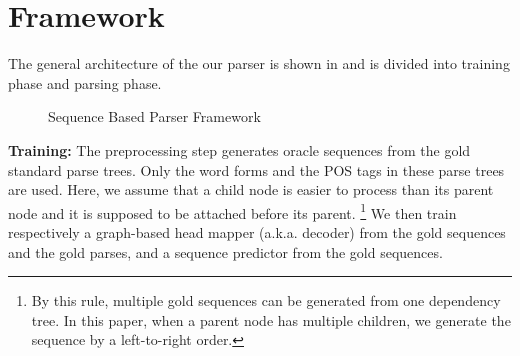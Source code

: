 \section{Framework}
The general architecture of the our parser is shown in 
and is divided into training phase and parsing phase.

\begin{figure}[th]
\centering
{}
\caption{Sequence Based Parser Framework}
\label{fig:workflow}
\end{figure}

{\bf Training:} The preprocessing step generates oracle sequences
from the gold standard parse trees. Only the word forms and the POS tags 
in these parse trees are used. Here, we assume that a child node is
easier to process than its parent node and it is supposed to be attached
before its parent. \footnote{By this rule, multiple gold sequences
can be generated from one dependency tree. In this paper, when a parent node
has multiple children, we generate the sequence by a left-to-right order.}
We then train respectively a graph-based head mapper (a.k.a. decoder)
from the gold sequences and the gold parses, and a sequence predictor
from the gold sequences.

